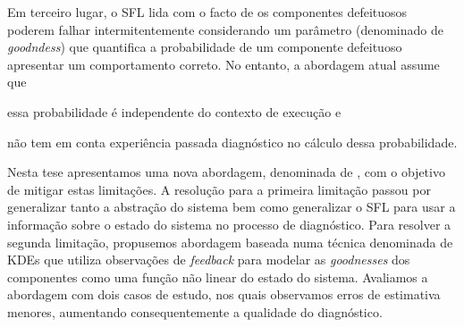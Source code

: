 Em terceiro lugar, o \ac{SFL} lida com o facto de os componentes
defeituosos poderem falhar intermitentemente considerando um parâmetro
(denominado de \emph{goodndess}) que quantifica a probabilidade de um
componente defeituoso apresentar um comportamento correto.
%
No entanto, a abordagem atual assume que
\begin {inparaenum} [(1)]
\item essa probabilidade é independente do contexto de execução e
\item não tem em conta experiência passada diagnóstico no cálculo
  dessa probabilidade.
\end {inparaenum}
%
Nesta tese apresentamos uma nova abordagem, denominada de \NFGE{}, com
o objetivo de mitigar estas limitações.
%
A resolução para a primeira limitação passou por generalizar tanto a
abstração do sistema bem como generalizar o \ac{SFL} para usar a
informação sobre o estado do sistema no processo de diagnóstico.
%
Para resolver a segunda limitação, propusemos abordagem baseada numa
técnica denominada de \aclp{KDE} que utiliza observações de
\emph{feedback} para modelar as \emph{goodnesses} dos componentes como
uma função não linear do estado do sistema.
%
Avaliamos a abordagem com dois casos de estudo, nos quais observamos
erros de estimativa menores, aumentando consequentemente a qualidade
do diagnóstico.
